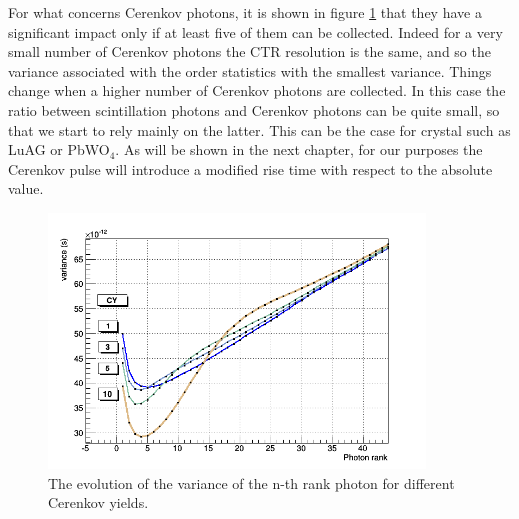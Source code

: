 For what concerns Cerenkov photons, it is shown in figure \ref{fig:rise_rank} that they have a significant impact only if at least five of them can be collected. Indeed for a very small number of Cerenkov photons the CTR resolution is the same, and so the variance associated with the order statistics with the smallest variance.
Things change when a higher number of Cerenkov photons are collected. In this case the ratio between scintillation photons and Cerenkov photons can be quite small, so that we start to rely mainly on the latter.
This can be the case for crystal such as LuAG or PbWO$_{4}$. As will be shown in the next chapter, for our purposes the Cerenkov pulse will introduce a modified rise time with respect to the absolute value.
\begin{figure}[htbp]
\begin{center}
\includegraphics[width=10cm]{../Pictures/Chapter_4/CER_photon_rank.png}
\end{center}
\caption[Rank variance - Cerenkov]{The evolution of the variance of the n-th rank photon for different Cerenkov yields.}
\label{fig:rise_rank}
\end{figure}

